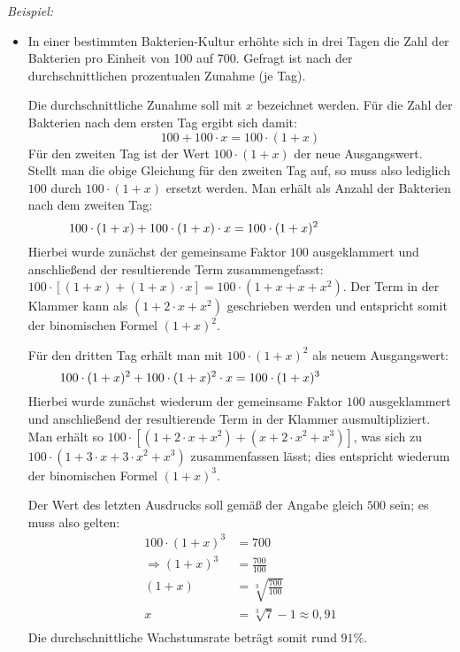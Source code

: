 \documentclass[a4paper]{article}
\begin{document}

\emph{Beispiel:}
%
\begin{itemize}

\item In einer bestimmten Bakterien-Kultur erhöhte sich in drei Tagen die Zahl der
Bakterien pro Einheit von 100 auf 700. Gefragt ist nach der durchschnittlichen
prozentualen Zunahme (je Tag).

Die durchschnittliche Zunahme soll mit $x$ bezeichnet werden. Für die Zahl
der Bakterien nach dem ersten Tag ergibt sich damit:
%
\begin{equation*}
100 + 100 \cdot x = 100 \cdot (1 + x)
\end{equation*}
Für den zweiten Tag ist der Wert $100 \cdot (1+x)$ der neue
Ausgangswert. Stellt man die obige Gleichung für den zweiten Tag auf, so muss
also lediglich $100$ durch $100 \cdot (1+x)$ ersetzt werden. Man
erhält als Anzahl der Bakterien nach dem zweiten Tag:
%
\begin{equation*}
100 \cdot (1+x) + 100 \cdot (1+x) \cdot x = 100 \cdot (1 + x)^2
{\color{white} \qquad \qquad \qquad \quad \;.}
\end{equation*}
Hierbei wurde zunächst der gemeinsame Faktor $100$ ausgeklammert und
anschließend der resultierende Term zusammengefasst: $100 \cdot [(1+x) +
(1+x)\cdot x] = 100 \cdot (1 +x +x + x^2)$. Der Term in der Klammer kann als
$(1 + 2 \cdot x + x^2)$ geschrieben werden und entspricht somit der
binomischen Formel $(1+x)^2$.

Für den dritten Tag erhält man mit $100 \cdot (1+x)^2$ als neuem
Ausgangswert:
%
\begin{equation*}
100 \cdot (1+x)^2 + 100\cdot (1+x)^2 \cdot x = 100 \cdot (1+x)^3
{\color{white} \qquad \qquad \qquad \quad \;\;\;.}
\end{equation*}
Hierbei wurde zunächst wiederum der gemeinsame Faktor $100$
ausgeklammert und anschließend der resultierende Term in der Klammer
ausmultipliziert. Man erhält so $100 \cdot \left[ (1 + 2 \cdot x + x^2)
+(x+ 2\cdot x^2 + x^3) \right]$, was sich zu $100 \cdot (1 + 3 \cdot x
+3\cdot x^2 + x^3)$ zusammenfassen lässt; dies entspricht wiederum der
binomischen Formel $(1+x)^3$.

Der Wert des letzten Ausdrucks soll gemäß der Angabe gleich $500$ sein;
es muss also gelten:
%
\begin{align*}
100 \cdot (1 + x)^3 &= 700 \\
\Rightarrow (1 + x)^3 &= \frac{700}{100} \\
(1 + x) &= \sqrt[3]{\frac{700}{100}} \\
x &= \sqrt[3]{7} - 1 \approx 0,91 \\
\end{align*}
Die durchschnittliche Wachstumsrate beträgt somit rund $91\%$.

\end{itemize}
\end{document}
